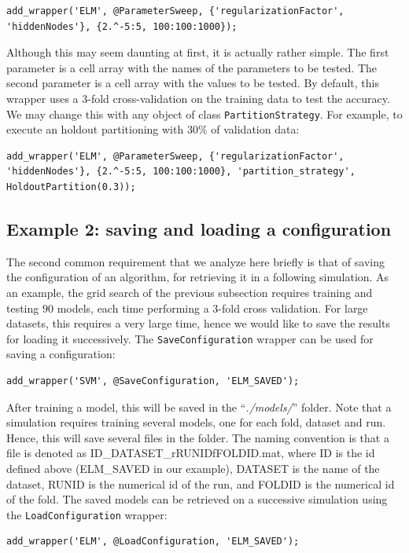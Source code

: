 \begin{lstlisting}
add_wrapper('ELM', @ParameterSweep, {'regularizationFactor', 'hiddenNodes'}, {2.^-5:5, 100:100:1000});
\end{lstlisting}

\noindent Although this may seem daunting at first, it is actually rather simple. The first parameter is a cell array with the names of the parameters to be tested. The second parameter is a cell array with the values to be tested. By default, this wrapper uses a $3$-fold cross-validation on the training data to test the accuracy. We may change this with any object of class \verb|PartitionStrategy|. For example, to execute an holdout partitioning with $30\%$ of validation data:

\begin{lstlisting}
add_wrapper('ELM', @ParameterSweep, {'regularizationFactor', 'hiddenNodes'}, {2.^-5:5, 100:100:1000}, 'partition_strategy', HoldoutPartition(0.3));
\end{lstlisting}

\subsection{Example 2: saving and loading a configuration}

The second common requirement that we analyze here briefly is that of saving the configuration of an algorithm, for retrieving it in a following simulation. As an example, the grid search of the previous subsection requires training and testing $90$ models, each time performing a $3$-fold cross validation. For large datasets, this requires a very large time, hence we would like to save the results for loading it successively. The \verb|SaveConfiguration| wrapper can be used for saving a configuration:

\begin{lstlisting}
add_wrapper('SVM', @SaveConfiguration, 'ELM_SAVED');
\end{lstlisting}

\noindent After training a model, this will be saved in the ``\textit{./models/}'' folder. Note that a simulation requires training several models, one for each fold, dataset and run. Hence, this will save several files in the folder. The naming convention is that a file is denoted as ID\_DATASET\_rRUNIDfFOLDID.mat, where ID is the id defined above (ELM\_SAVED in our example), DATASET is the name of the dataset, RUNID is the numerical id of the run, and FOLDID is the numerical id of the fold. The saved models can be retrieved on a successive simulation using the \verb|LoadConfiguration| wrapper:

\begin{lstlisting}
add_wrapper('ELM', @LoadConfiguration, 'ELM_SAVED');
\end{lstlisting}